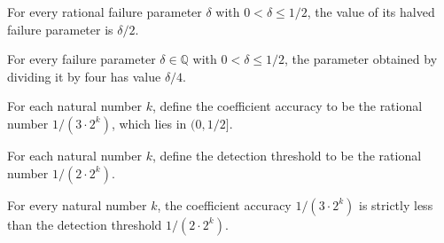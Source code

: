 \begin{theorem}
\label{FABL.lowDegreeJuntaHalfFailure_value}
\leanok
{}
For every rational failure parameter $\delta$ with $0<\delta\le1/2$, the value of its
halved failure parameter is $\delta/2$.
\end{theorem}

\begin{theorem}
\label{FABL.lowDegreeJuntaQuarterFailure_value}
\leanok
{}
For every failure parameter $\delta\in\mathbb{Q}$ with $0<\delta\le1/2$, the parameter
obtained by dividing it by four has value $\delta/4$.
\end{theorem}

\begin{definition}
\label{FABL.lowDegreeJuntaCoefficientAccuracy}
\leanok
{}
For each natural number $k$, define the coefficient accuracy to be the rational number
$1/(3\cdot 2^k)$, which lies in $(0,1/2]$.
\end{definition}

\begin{definition}
\label{FABL.lowDegreeJuntaDetectionThreshold}
\leanok
For each natural number $k$, define the detection threshold to be the rational number
$1/(2\cdot 2^k)$.
\end{definition}

\begin{theorem}
\label{FABL.lowDegreeJuntaAccuracy_lt_detectionThreshold}
\leanok
{}
For every natural number $k$, the coefficient accuracy $1/(3\cdot 2^k)$ is strictly less
than the detection threshold $1/(2\cdot 2^k)$.
\end{theorem}

